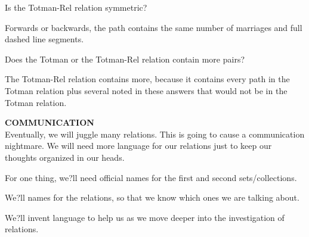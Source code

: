 \documentclass{ximera}
\begin{document}
\begin{exercise}
\begin{problem} Is the Totman-Rel relation symmetric?  
\begin{feedback}
Forwards or backwards, the path contains the same number of marriages and full dashed line segments.
\end{feedback}
\end{problem}

\begin{problem} Does the Totman or the Totman-Rel relation contain more pairs?  
\begin{feedback}
The Totman-Rel relation contains more, because it contains every path in the Totman relation plus several noted in these answers that would not be in the Totman relation.
\end{feedback}
\end{problem}





\end{exercise}



\begin{remark} \textbf{COMMUNICATION} \\
Eventually, we will juggle many relations. This is going to cause a communication nightmare. We will need more language for our relations just to keep our thoughts organized in our heads.

For one thing, we?ll need official names for the first and second sets/collections.

We?ll names for the relations, so that we know which ones we are talking about.

We?ll invent language to help us as we move deeper into the investigation of relations.

\end{remark}
\end{document}

